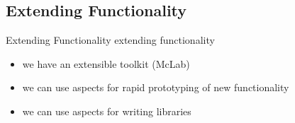 

\subsection*{Extending Functionality}
\begin{frame}{Extending Functionality}
  extending functionality
  \begin{itemize}
  \item we have an extensible toolkit (McLab)
  \item we can use aspects for rapid prototyping of new functionality
  \item we can use aspects for writing libraries
  \end{itemize}
\end{frame}


